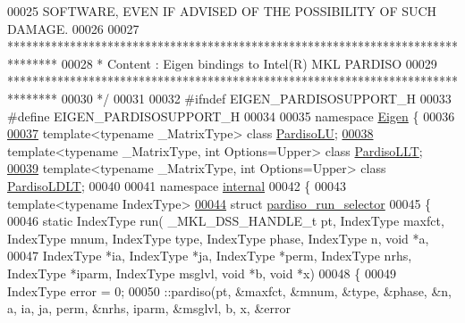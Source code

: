 \begin{DoxyCode}
00025 \textcolor{comment}{ SOFTWARE, EVEN IF ADVISED OF THE POSSIBILITY OF SUCH DAMAGE.}
00026 \textcolor{comment}{}
00027 \textcolor{comment}{ ********************************************************************************}
00028 \textcolor{comment}{ *   Content : Eigen bindings to Intel(R) MKL PARDISO}
00029 \textcolor{comment}{ ********************************************************************************}
00030 \textcolor{comment}{*/}
00031 
00032 \textcolor{preprocessor}{#ifndef EIGEN\_PARDISOSUPPORT\_H}
00033 \textcolor{preprocessor}{#define EIGEN\_PARDISOSUPPORT\_H}
00034 
00035 \textcolor{keyword}{namespace }\hyperlink{namespace_eigen}{Eigen} \{ 
00036 
\hyperlink{class_eigen_1_1_pardiso_l_u}{00037} \textcolor{keyword}{template}<\textcolor{keyword}{typename} \_MatrixType> \textcolor{keyword}{class }\hyperlink{class_eigen_1_1_pardiso_l_u}{PardisoLU};
\hyperlink{class_eigen_1_1_pardiso_l_l_t}{00038} \textcolor{keyword}{template}<\textcolor{keyword}{typename} \_MatrixType, \textcolor{keywordtype}{int} Options=Upper> \textcolor{keyword}{class }\hyperlink{class_eigen_1_1_pardiso_l_l_t}{PardisoLLT};
\hyperlink{class_eigen_1_1_pardiso_l_d_l_t}{00039} \textcolor{keyword}{template}<\textcolor{keyword}{typename} \_MatrixType, \textcolor{keywordtype}{int} Options=Upper> \textcolor{keyword}{class }\hyperlink{class_eigen_1_1_pardiso_l_d_l_t}{PardisoLDLT};
00040 
00041 \textcolor{keyword}{namespace }\hyperlink{namespaceinternal}{internal}
00042 \{
00043   \textcolor{keyword}{template}<\textcolor{keyword}{typename} IndexType>
\hyperlink{struct_eigen_1_1internal_1_1pardiso__run__selector}{00044}   \textcolor{keyword}{struct }\hyperlink{struct_eigen_1_1internal_1_1pardiso__run__selector}{pardiso\_run\_selector}
00045   \{
00046     \textcolor{keyword}{static} IndexType run( \_MKL\_DSS\_HANDLE\_t pt, IndexType maxfct, IndexType mnum, IndexType type, IndexType
       phase, IndexType n, \textcolor{keywordtype}{void} *a,
00047                       IndexType *ia, IndexType *ja, IndexType *perm, IndexType nrhs, IndexType *iparm, 
      IndexType msglvl, \textcolor{keywordtype}{void} *b, \textcolor{keywordtype}{void} *x)
00048     \{
00049       IndexType error = 0;
00050       ::pardiso(pt, &maxfct, &mnum, &type, &phase, &n, a, ia, ja, perm, &nrhs, iparm, &msglvl, b, x, &error

\end{DoxyCode}
